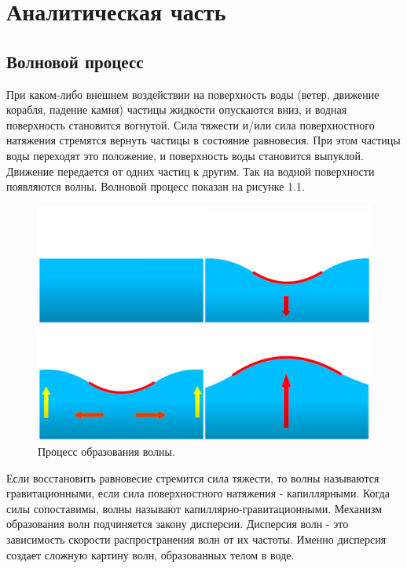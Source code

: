 \chapter{Аналитическая часть}

\section{Волновой процесс}

При каком-либо внешнем воздействии на поверхность воды (ветер, движение корабля, падение камня) частицы жидкости опускаются вниз, и водная поверхность становится вогнутой. Сила тяжести и/или сила поверхностного натяжения стремятся вернуть частицы в состояние равновесия. При этом частицы воды переходят это положение, и поверхность воды становится выпуклой. Движение передается от одних частиц к другим. Так на водной поверхности появляются волны. Волновой процесс показан на рисунке 1.1.

\begin{figure}[H]
	\begin{center}
		\includegraphics[scale=0.08]{img/wave-process.jpg}
	\end{center}
	\captionsetup{justification=centering}
	\caption{Процесс образования волны.}
	\label{img:wave-process}
\end{figure}

Если восстановить равновесие стремится сила тяжести, то волны называются гравитационными, если сила поверхностного натяжения - капиллярными. Когда силы сопоставимы, волны называют капиллярно-гравитационными. Механизм образования волн подчиняется закону дисперсии. Дисперсия волн - это зависимость скорости распространения волн от их частоты. Именно дисперсия создает сложную картину волн, образованных телом в воде.

